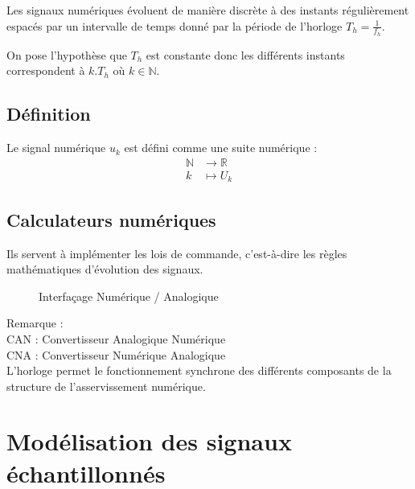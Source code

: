 \documentclass[main.tex]{subfiles}
\begin{document}
Les signaux numériques évoluent de manière discrète à des instants régulièrement espacés par un intervalle de temps donné par la période de l'horloge $T_h = \frac{1}{f_h}$.

On pose l'hypothèse que $T_h$ est constante donc les différents instants correspondent à $k.T_h$ où $k\in\mathbb{N}$.\\

\subsection*{Définition}
Le signal numérique $u_k$ est défini comme une suite numérique :
\begin{align*}
\mathbb{N} & \rightarrow \mathbb{R} \\
k & \mapsto U_k
\end{align*}

\subsection*{Calculateurs numériques}
Ils servent à implémenter les lois de commande, c'est-à-dire les règles mathématiques d'évolution des signaux.

\begin{figure}[h!]
\centering
{}
\caption{Interfaçage Numérique / Analogique}
\end{figure}

\noindent Remarque :\\
CAN : Convertisseur Analogique Numérique\\CNA : Convertisseur Numérique Analogique\\

L'horloge permet le fonctionnement synchrone des différents composants de la structure de l'asservissement numérique.

\section{Modélisation des signaux échantillonnés}
\end{document}
